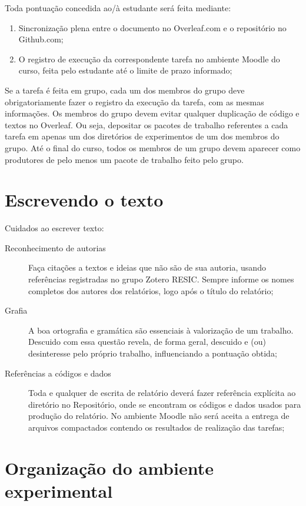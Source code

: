 Toda pontuação concedida ao/à estudante será feita mediante:
\begin{enumerate}
    \item Sincronização plena entre o documento no Overleaf.com e o repositório no Github.com;
    \item O registro de execução da correspondente tarefa no ambiente Moodle do curso, feita pelo estudante até o limite de prazo informado;
\end{enumerate}

Se a tarefa é feita em grupo, cada um dos membros do grupo deve obrigatoriamente fazer o registro da execução da tarefa, com as mesmas informações. Os membros do grupo devem evitar qualquer duplicação de código e textos no Overleaf. Ou seja, depositar os pacotes de trabalho referentes a cada tarefa em apenas um dos diretórios de experimentos de um dos membros do grupo. Até o final do curso, todos os membros de um grupo devem aparecer como produtores de pelo menos um pacote de trabalho feito pelo grupo.

\section{Escrevendo o texto}

Cuidados ao escrever texto:
\begin{description}
\item [Reconhecimento de autorias] Faça citações a textos e ideias que não são de sua autoria, usando referências registradas no grupo Zotero RESIC. Sempre informe os nomes completos dos autores dos relatórios, logo após o título do relatório;
\item [Grafia] A boa ortografia e gramática são essenciais à valorização de um trabalho. Descuido com essa questão revela, de forma geral, descuido e (ou) desinteresse pelo próprio trabalho, influenciando a pontuação obtida;
\item [Referências a códigos e dados] Toda e qualquer de escrita de relatório deverá fazer referência explícita ao diretório no Repositório, onde se encontram os códigos e dados usados para produção do relatório. No ambiente Moodle não será aceita a entrega de arquivos compactados contendo os resultados de realização das tarefas;
\end{description}

\section{Organização do ambiente experimental}

